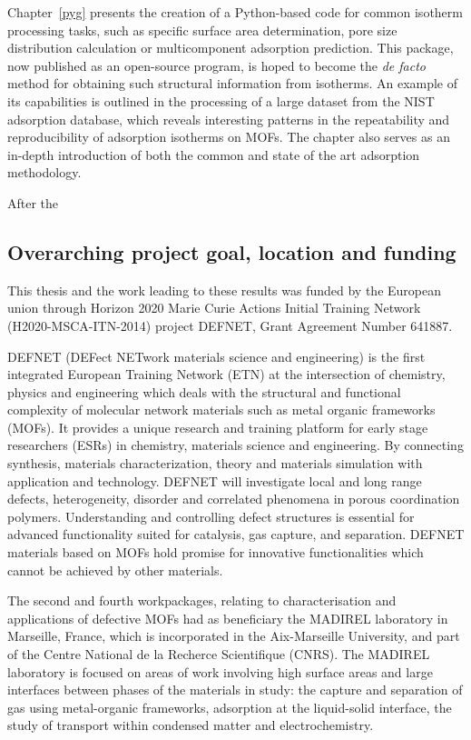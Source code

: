Chapter~\ref{pyg} presents the creation of a Python-based code for
common isotherm processing tasks, such as specific surface area 
determination, pore size distribution calculation or multicomponent 
adsorption prediction. This package, now published as an 
open-source program, is hoped to become the \textit{de facto}
method for obtaining such structural information from isotherms. 
An example of its capabilities is outlined in the processing of 
a large dataset from the NIST adsorption database, which reveals 
interesting patterns in the repeatability and reproducibility of 
adsorption isotherms on MOFs. The chapter also serves as an in-depth
introduction of both the common and state of the art adsorption methodology.

After the 

\subsection*{Overarching project goal, location and funding}

This thesis and the work leading to these results 
was funded by the European union through Horizon 2020 Marie Curie
Actions Initial Training Network (H2020-MSCA-ITN-2014)
project DEFNET, Grant Agreement Number 641887.

DEFNET (DEFect NETwork materials science and engineering) is
the first integrated European Training Network (ETN) at the intersection
of chemistry, physics and engineering which deals with the structural and
functional complexity of molecular network materials such as metal organic 
frameworks (MOFs). It provides a unique research and training platform for
early stage researchers (ESRs) in chemistry, materials science and engineering.
By connecting synthesis, materials characterization, theory and materials simulation
with application and technology. DEFNET will investigate local and long
range defects, heterogeneity, disorder and correlated phenomena in
porous coordination polymers.
Understanding and controlling defect structures is essential for advanced
functionality suited for catalysis, gas capture, and separation. DEFNET
materials based on MOFs hold promise for innovative functionalities which
cannot be achieved by other materials.

The second and fourth workpackages, relating to characterisation and applications 
of defective MOFs had as beneficiary the MADIREL laboratory in Marseille, France,
which is incorporated in the Aix-Marseille University, and part of the Centre
National de la Recherce Scientifique (CNRS). The MADIREL laboratory is focused
on areas of work involving high surface areas and large interfaces 
between phases of the materials in study: the capture and separation of
gas using metal-organic frameworks, adsorption at the liquid-solid interface,
the study of transport within condensed matter and electrochemistry.